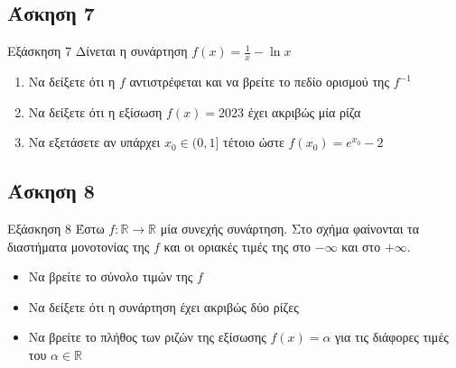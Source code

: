 \documentclass[greek]{beamer}
\begin{document}
\subsection{Άσκηση 7}
\begin{frame}{Εξάσκηση 7}
 Δίνεται η συνάρτηση $f(x)=\frac{1}{x}-\ln x$
 \begin{enumerate}
  \item<1-> Να δείξετε ότι η $f$ αντιστρέφεται και να βρείτε το πεδίο ορισμού της $f^{-1}$
  \item<2-> Να δείξετε ότι η εξίσωση $f(x)=2023$ έχει ακριβώς μία ρίζα
  \item<3-> Να εξετάσετε αν υπάρχει $x_0\in (0,1]$ τέτοιο ώστε $f(x_0)=e^{x_0}-2$
 \end{enumerate}
\end{frame}

\subsection{Άσκηση 8}
\begin{frame}{Εξάσκηση 8}
 Έστω $f:\mathbb{R}\to\mathbb{R}$ μία συνεχής συνάρτηση. Στο σχήμα φαίνονται τα διαστήματα μονοτονίας της $f$ και οι οριακές τιμές της στο $-\infty$ και στο $+\infty$.

 \centering
 \begin{itemize}
  \item<1-> Να βρείτε το σύνολο τιμών της $f$
  \item<2-> Να δείξετε ότι η συνάρτηση έχει ακριβώς δύο ρίζες
  \item<3-> Να βρείτε το πλήθος των ριζών της εξίσωσης $f(x)=α$ για τις διάφορες τιμές του $α\in\mathbb{R}$
 \end{itemize}
\end{frame}
\end{document}
